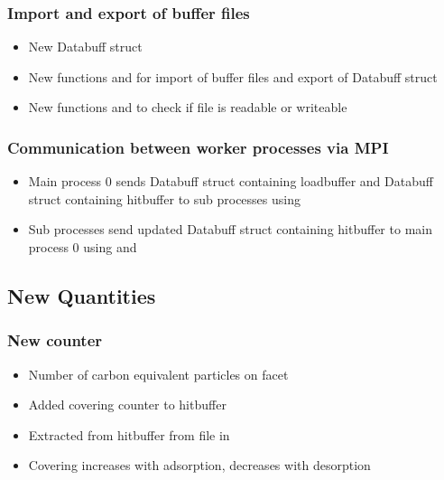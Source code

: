 \subsubsection{Import and export of buffer files}
\begin{itemize}[noitemsep,topsep=0pt]
\item New Databuff struct 
\item New functions  and  for import of buffer files and export of Databuff struct
\item New functions  and  to check if file is readable or writeable
\end{itemize}

\subsubsection{Communication between worker processes via MPI}
\begin{itemize}[noitemsep,topsep=0pt]
\item Main process 0 sends Databuff struct containing loadbuffer and Databuff struct containing hitbuffer to sub processes using 
\item Sub processes send updated Databuff struct containing hitbuffer to main process 0 using  and 
\end{itemize}

\subsection{New Quantities}
\subsubsection{New counter }
\begin{itemize}[noitemsep,topsep=0pt]
\item Number of carbon equivalent particles on facet
\item Added covering counter to hitbuffer
\item Extracted from hitbuffer from  file in 
\item Covering increases with adsorption, decreases with desorption
\end{itemize}

